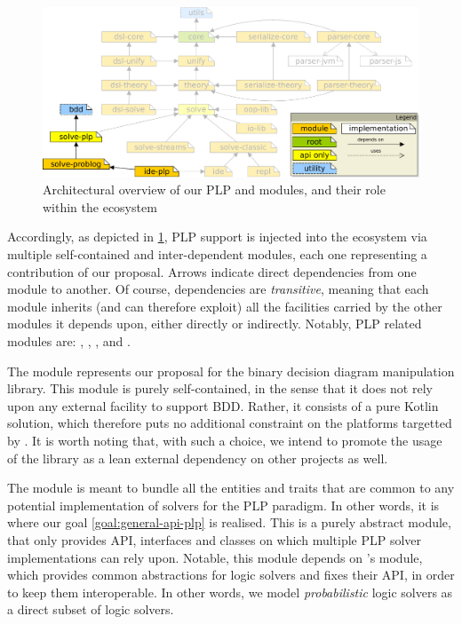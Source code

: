 \documentclass[12pt,a4paper,openright,twoside]{book}
\begin{document}
\begin{figure}
    \centering
    \includegraphics[width=\linewidth]{figures/project-map.pdf}
    \caption{Architectural overview of our PLP and \problog{} modules, and their role within the \twopkt{} ecosystem}
    \label{fig:design-arch-modules}
\end{figure}

Accordingly, as depicted in \cref{fig:design-arch-modules}, PLP support is injected into the ecosystem via multiple self-contained and inter-dependent modules, each one representing a contribution of our proposal.
%
Arrows indicate direct dependencies from one module to another.
%
Of course, dependencies are \emph{transitive}, meaning that each module inherits (and can therefore exploit) all the facilities carried by the other modules it depends upon, either directly or indirectly.
%
Notably, PLP related modules are: , , , and .

The  module represents our proposal for the binary decision diagram manipulation library.
%
This module is purely self-contained, in the sense that it does not rely upon any external facility to support BDD.
%
Rather, it consists of a pure Kotlin solution, which therefore puts no additional constraint on the platforms targetted by \twopkt{}.
%
It is worth noting that, with such a choice, we intend to promote the usage of the library as a lean external dependency on other projects as well.

The  module is meant to bundle all the entities and traits that are common to any potential implementation of solvers for the PLP paradigm.
%
In other words, it is where our goal \ref{goal:general-api-plp} is realised.
%
This is a purely abstract module, that only provides API, interfaces and classes on which multiple PLP solver implementations can rely upon.
%
Notable, this module depends on \twopkt{}'s  module, which provides common abstractions for logic solvers and fixes their API, in order to keep them interoperable.
%
In other words, we model \emph{probabilistic} logic solvers as a direct subset of logic solvers.
\end{document}
